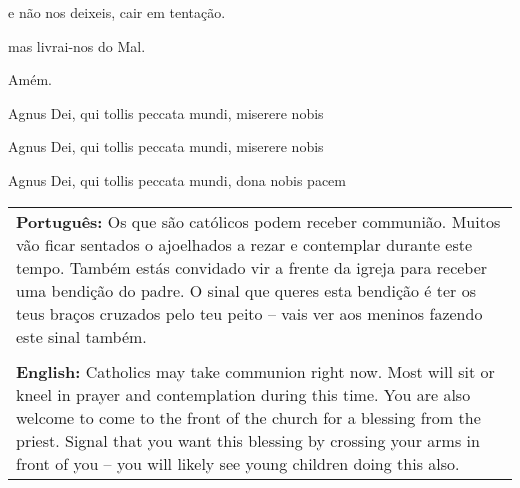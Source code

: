 e não nos deixeis, cair em tentação. 

mas livrai-nos do Mal.

Amém.



Agnus Dei, qui tollis peccata mundi, miserere nobis

Agnus Dei, qui tollis peccata mundi, miserere nobis

Agnus Dei, qui tollis peccata mundi, dona nobis pacem





\begin{tabular}{p{3.5in}}
{\bf Português:} Os que são católicos podem receber communião. Muitos vão ficar sentados o ajoelhados a rezar e contemplar durante este tempo. Também estás convidado vir a frente da igreja para receber uma bendição do padre. O sinal que queres esta bendição é ter os teus braços cruzados pelo teu peito -- vais ver aos meninos fazendo este sinal também.\\
\\
{\bf English:} Catholics may take communion right now. Most will sit or kneel in prayer and contemplation during this time. You are also welcome to come to the front of the church for a blessing from the priest. Signal that you want this blessing by crossing your arms in front of you -- you will likely see young children doing this also.\\
\end{tabular}


\newpage


